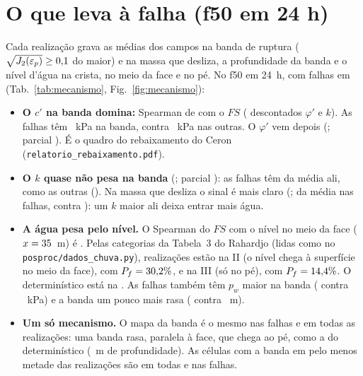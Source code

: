 \documentclass[11pt,a4paper]{article}
\begin{document}
\section{O que leva à falha (f50 em 24 h)}\label{sec:mecanismo}
Cada realização grava as médias dos campos na banda de ruptura ($\sqrt{J_2(\varepsilon_p)} \geq 0{,}1$ do maior)
e na massa que desliza, a profundidade da banda e o nível d'água na crista, no meio da face e no pé. No f50 em 24~h, com
\NfMec{} falhas em \NMec{} (Tab.~\ref{tab:mecanismo}, Fig.~\ref{fig:mecanismo}):
\begin{itemize}
\item \textbf{O $c'$ na banda domina:} Spearman de \RhoC{} com o $FS$ (\ParcC{} descontados $\varphi'$ e $k$). As falhas
têm \FalhaC~kPa na banda, contra \OutrasC~kPa nas outras. O $\varphi'$ vem depois (\RhoPhi; parcial \ParcPhi). É o
quadro do rebaixamento do Ceron (\texttt{relatorio\_rebaixamento.pdf}).
\item \textbf{O $k$ quase não pesa na banda} (\RhoK; parcial \ParcK): as falhas têm \FalhaK{} da média ali, como as
outras (\OutrasK). Na massa que desliza o sinal é mais claro (\RhoKMassa; \FalhaKMassa{} da média nas falhas,
contra \OutrasKMassa): um $k$ maior ali deixa entrar mais água.
\item \textbf{A água pesa pelo nível.} O Spearman do $FS$ com o nível no meio da face ($x = 35$~m) é
\RhoNivelMeio. Pelas categorias da Tabela~3 do Rahardjo (lidas como no \texttt{posproc/dados\_chuva.py}), \CatDois{}
realizações estão na II (o nível chega à superfície no meio da face), com $P_f = 30{,}2\%$, e \CatTres{} na III (só
no pé), com $P_f = 14{,}4\%$. O determinístico está na \CatDet. As falhas também têm $p_w$ maior na banda
(\FalhaPw{} contra \OutrasPw~kPa) e a banda um pouco mais rasa (\FalhaProf{} contra \OutrasProf~m).
\item \textbf{Um só mecanismo.} O mapa da banda é o mesmo nas falhas e em todas as realizações: uma banda rasa,
paralela à face, que chega ao pé, como a do determinístico (\ProfDetMec~m de profundidade). As células com a banda em
pelo menos metade das realizações são \CelulasMetade{} em todas e \CelulasMetadeFalha{} nas falhas.
\end{itemize}
\end{document}
